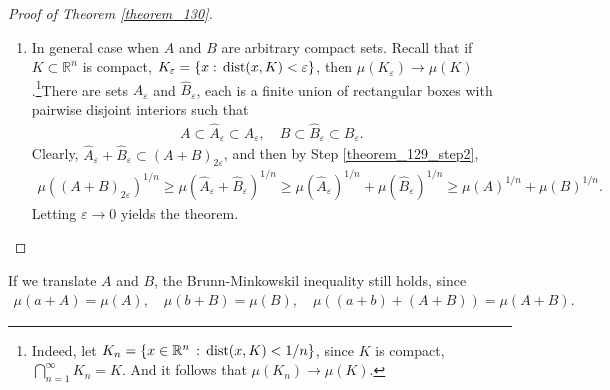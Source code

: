 \begin{proof}[Proof of Theorem \ref{theorem_130}]
\begin{enumerate}[label=(\Roman*)]
    Let $A^\pm = \pi^\pm \cap A$, $B^\pm = \pi^\pm \cap B$. Let $\lambda = \mu(A^+)/\mu(A)$. By translating, we can make sure that $\mu(B^+)/\mu(B) = \lambda$. Then the total number of boxes in $A^+ \cup B^+$ is less than or equal to $k$ and that in $A^- \cup B^-$ is also less than or equal to $k$. Hence, the induction hypothesis applies. Also, $A^+ + B^+$ and $A^- + B^-$ have disjoint interiors, then 
    \begin{align*}
        \mu(A + B) & \geq \mu(A^+ \cup B^+) + \mu(A^- \cup B^-) \\
        & \geq \left(\mu(A^+)^{1/n} + \mu(B^+)^{1/n}\right)^n + \left(\mu(A^-)^{1/n} + \mu(B^-)^{1/n}\right)^n \\
        & = \lambda \left(\mu(A)^{1/n} + \mu(B)^{1/n}\right)^n + (1 - \lambda) \left(\mu(A)^{1/n} + \mu(B)^{1/n}\right)^n \\
        & = \left(\mu(A)^{1/n} + \mu(B)^{1/n}\right)^n,
    \end{align*}
    which implies 
    \begin{align*}
        \mu(A + B)^{1/n} \geq \mu(A)^{1/n} + \mu(B)^{1/n}.
    \end{align*}\label{theorem_129_step2}
    
    \item In general case when $A$ and $B$ are arbitrary compact sets. Recall that if $K \subset \mathbb{R}^n$ is compact, $K_\varepsilon = \{x :\, {\operatorname{dist}}(x,K) < \varepsilon\}$, then $\mu(K_\varepsilon) \to \mu(K)$.\footnote{Indeed, let $K_n = \{x \in \mathbb{R}^n \,:\, {\operatorname{dist}}(x,K) < 1/n\}$, since $K$ is compact, $\bigcap^\infty_{n=1} K_n = K$. And it follows that $\mu(K_n) \to \mu(K)$.}There are sets $\widehat{A}_{\varepsilon}$ and $\widehat{B}_{\varepsilon}$, each is a finite union of rectangular boxes with pairwise disjoint interiors such that 
    \begin{align*}
        A \subset \widehat{A}_{\varepsilon} \subset A_\varepsilon, \quad B \subset \widehat{B}_{\varepsilon} \subset B_\varepsilon.
    \end{align*}
    Clearly, $\widehat{A}_{\varepsilon} + \widehat{B}_{\varepsilon} \subset (A+B)_{2\varepsilon}$, and then by Step \ref{theorem_129_step2},
    \begin{align*}
        \mu\left((A+B)_{2\varepsilon}\right)^{1/n} \geq \mu\left(\widehat{A}_{\varepsilon} + \widehat{B}_{\varepsilon}\right)^{1/n} \geq \mu\left(\widehat{A}_{\varepsilon}\right)^{1/n} + \mu\left(\widehat{B}_{\varepsilon}\right)^{1/n} \geq \mu(A)^{1/n} + \mu(B)^{1/n}.
    \end{align*}
    Letting $\varepsilon \to 0$ yields the theorem.
\end{enumerate}
\end{proof}

\medskip

\begin{remark}\label{remark_d1}
If we translate $A$ and $B$, the Brunn-Minkowskil inequality still holds, since
\begin{align*}
    \mu(a + A) = \mu(A), \quad \mu(b + B) = \mu(B), \quad \mu((a+b) + (A+B)) = \mu(A+B).
\end{align*}
\end{remark}